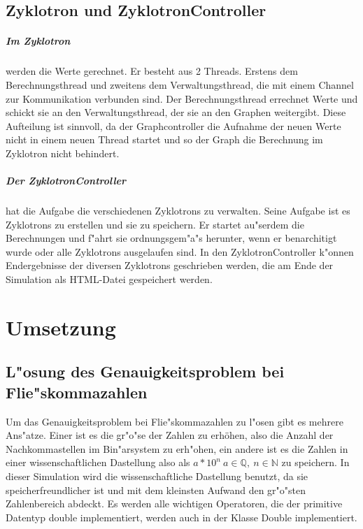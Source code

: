 \documentclass[14pt, a4paper]{report}
\begin{document}
\section{Zyklotron und ZyklotronController}
\paragraph{Im Zyklotron} werden die Werte gerechnet. Er besteht aus 2 Threads. Erstens
dem Berechnungsthread und zweitens dem Verwaltungsthread, die mit einem Channel zur
Kommunikation verbunden sind. Der Berechnungsthread errechnet Werte und schickt sie an
den Verwaltungsthread, der sie an den Graphen weitergibt. Diese Aufteilung ist sinnvoll,
da der Graphcontroller die Aufnahme der neuen Werte nicht in einem neuen Thread startet
und so der Graph die Berechnung im Zyklotron nicht behindert.

\paragraph{Der ZyklotronController} hat die Aufgabe die verschiedenen Zyklotrons zu
verwalten. Seine Aufgabe ist es Zyklotrons zu erstellen und sie zu speichern. Er startet
au"serdem die Berechnungen und f"ahrt sie ordnungsgem"a"s herunter, wenn er 
benarchitigt wurde oder alle Zyklotrons ausgelaufen sind. In den ZyklotronController
k"onnen Endergebnisse der diversen Zyklotrons geschrieben werden, die am Ende der 
Simulation als HTML-Datei gespeichert werden.

\chapter{Umsetzung}
\section{L"osung des Genauigkeitsproblem bei Flie"skommazahlen}
Um das Genauigkeitsproblem bei Flie"skommazahlen zu l"osen gibt es mehrere Ans"atze.
Einer ist es die gr"o"se der Zahlen zu erhöhen, also die Anzahl der Nachkommastellen im
Bin"arsystem zu erh"ohen, ein andere ist es die Zahlen in einer wissenschaftlichen
Dastellung also als $a * 10^n ~ a \in \mathbb Q, ~ n \in \mathbb N$ zu speichern. In
dieser Simulation wird die wissenschaftliche Dastellung benutzt, da sie 
speicherfreundlicher ist und mit dem kleinsten Aufwand den gr"o"sten Zahlenbereich
abdeckt. Es werden alle wichtigen Operatoren, die der primitive Datentyp double 
implementiert, werden auch in der Klasse Double implementiert.
\end{document}
